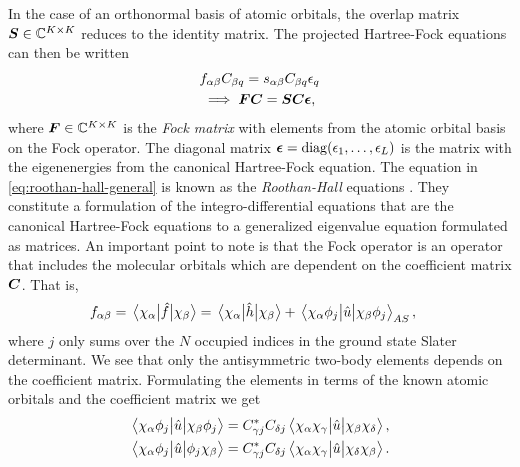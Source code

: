             In the case of an orthonormal basis of atomic orbitals, the overlap
            matrix $\boldsymbol{S} \in \mathbb{C}^{K \times K}$ reduces to the identity
            matrix.
            The projected Hartree-Fock equations can then be written
            \begin{gather}
                f_{\alpha\beta} C_{\beta q}
                = s_{\alpha \beta} C_{\beta q} \epsilon_{q}
                \\
                \implies
                \boldsymbol{F} \boldsymbol{C} = \boldsymbol{S} \boldsymbol{C} \boldsymbol{\epsilon},
                \label{eq:roothan-hall-general}
            \end{gather}
            where $\boldsymbol{F} \in \mathbb{C}^{K \times K}$ is the \emph{Fock
            matrix} with elements from the atomic orbital basis on the Fock
            operator.
            The diagonal matrix $\boldsymbol{\epsilon} = \operatorname{diag}(\epsilon_1, \dots,
            \epsilon_L)$ is the matrix with the eigenenergies from the canonical
            Hartree-Fock equation.
            The equation in \autoref{eq:roothan-hall-general} is known as the
            \emph{Roothan-Hall} equations \cite{roothan, hall}.
            They constitute a formulation of the integro-differential equations
            that are the canonical Hartree-Fock equations to a generalized
            eigenvalue equation formulated as matrices.
            An important point to note is that the Fock operator is an operator
            that includes the molecular orbitals which are dependent on the
            coefficient matrix $\boldsymbol{C}$.
            That is,
            \begin{align}
                f_{\alpha\beta}
                &= \mel{\chi_{\alpha}}{\hat{f}}{\chi_{\beta}}
                = \mel{\chi_{\alpha}}{\hat{h}}{\chi_{\beta}}
                +
                \mel{\chi_{\alpha}\phi_j}{\hat{u}}{\chi_{\beta}\phi_j}_{AS},
            \end{align}
            where $j$ only sums over the $N$ occupied indices in the ground state
            Slater determinant.
            We see that only the antisymmetric two-body elements depends on the
            coefficient matrix.
            Formulating the elements in terms of the known atomic orbitals and
            the coefficient matrix we get
            \begin{align}
                \mel{\chi_{\alpha}\phi_j}{\hat{u}}{\chi_{\beta}\phi_j}
                &=
                C^{*}_{\gamma j} C_{\delta j}
                \mel{\chi_{\alpha}\chi_{\gamma}}{\hat{u}}{\chi_{\beta}\chi_{\delta}},
                \\
                \mel{\chi_{\alpha}\phi_j}{\hat{u}}{\phi_j\chi_{\beta}}
                &=
                C^{*}_{\gamma j} C_{\delta j}
                \mel{\chi_{\alpha}\chi_{\gamma}}{\hat{u}}{\chi_{\delta}\chi_{\beta}}.
            \end{align}
